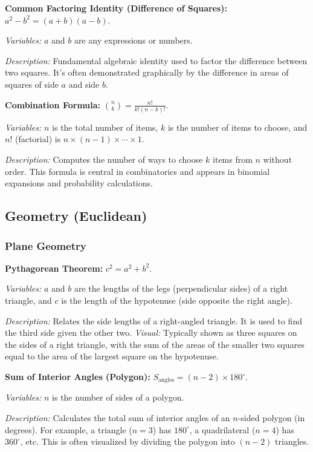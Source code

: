 \documentclass{article}
\begin{document}
\textbf{Common Factoring Identity (Difference of Squares):} $a^2 - b^2 = (a+b)(a-b)$.

\textit{Variables:} $a$ and $b$ are any expressions or numbers.

\textit{Description:} Fundamental algebraic identity used to factor the difference between two squares. It’s often demonstrated graphically by the difference in areas of squares of side $a$ and side $b$.

\textbf{Combination Formula:} $\displaystyle \binom{n}{k} = \frac{n!}{k!(n-k)!}$.

\textit{Variables:} $n$ is the total number of items, $k$ is the number of items to choose, and $n!$ (factorial) is $n \times (n-1) \times \cdots \times 1$.

\textit{Description:} Computes the number of ways to choose $k$ items from $n$ without order. This formula is central in combinatorics and appears in binomial expansions and probability calculations.

\subsection*{Geometry (Euclidean)}

\subsubsection*{Plane Geometry}

\textbf{Pythagorean Theorem:} $c^2 = a^2 + b^2$.

\textit{Variables:} $a$ and $b$ are the lengths of the legs (perpendicular sides) of a right triangle, and $c$ is the length of the hypotenuse (side opposite the right angle).

\textit{Description:} Relates the side lengths of a right-angled triangle. It is used to find the third side given the other two. \textit{Visual:} Typically shown as three squares on the sides of a right triangle, with the sum of the areas of the smaller two squares equal to the area of the largest square on the hypotenuse.

\textbf{Sum of Interior Angles (Polygon):} $S_{\text{angles}} = (n - 2)\times 180^\circ$.

\textit{Variables:} $n$ is the number of sides of a polygon.

\textit{Description:} Calculates the total sum of interior angles of an $n$-sided polygon (in degrees). For example, a triangle ($n=3$) has $180^\circ$, a quadrilateral ($n=4$) has $360^\circ$, etc. This is often visualized by dividing the polygon into $(n-2)$ triangles.
\end{document}
